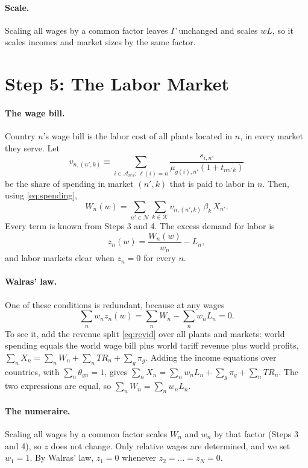 \documentclass[11pt]{article}
\newcommand{\cN}{\mathcal N}
\newcommand{\cK}{\mathcal K}
\newcommand{\cA}{\mathcal A}
\newcommand{\TR}{\mathit{TR}}
\begin{document}
\paragraph{Scale.} Scaling all wages by a common factor leaves $\Gamma$ unchanged and
scales $wL$, so it scales incomes and market sizes by the same factor.

\section{Step 5: The Labor Market}
\label{sec:labor}

\paragraph{The wage bill.} Country $n$'s wage bill is the labor cost of all plants
located in $n$, in every market they serve. Let
\begin{equation}
  v_{n,(n',k)}\equiv\sum_{i\in\cA_{n'k}:\,\ell(i)=n}\frac{s_{i,n'}}{\mu_{g(i),n'}(1+t_{nn'k})}
  \label{eq:vcoef}
\end{equation}
be the share of spending in market $(n',k)$ that is paid to labor in $n$. Then, using
\eqref{eq:spending},
\begin{equation}
  W_n(w)=\sum_{n'\in\cN}\sum_{k\in\cK}v_{n,(n',k)}\,\beta_k\,X_{n'} .
  \label{eq:wagebill}
\end{equation}
Every term is known from Steps 3 and 4. The excess demand for labor is
\begin{equation}
  z_n(w)=\frac{W_n(w)}{w_n}-L_n,
  \label{eq:excess}
\end{equation}
and labor markets clear when $z_n=0$ for every $n$.

\paragraph{Walras' law.} One of these conditions is redundant, because at any wages
\[
  \sum_nw_nz_n(w)=\sum_nW_n-\sum_nw_nL_n=0 .
\]
To see it, add the revenue split \eqref{eq:revid} over all plants and markets: world
spending equals the world wage bill plus world tariff revenue plus world profits,
$\sum_nX_n=\sum_nW_n+\sum_n\TR_n+\sum_g\pi_g$. Adding the income equations over
countries, with $\sum_n\theta_{gn}=1$, gives
$\sum_nX_n=\sum_nw_nL_n+\sum_g\pi_g+\sum_n\TR_n$. The two expressions are equal, so
$\sum_nW_n=\sum_nw_nL_n$.

\paragraph{The numeraire.} Scaling all wages by a common factor scales $W_n$ and $w_n$
by that factor (Steps 3 and 4), so $z$ does not change. Only relative wages are
determined, and we set $w_1=1$. By Walras' law, $z_1=0$ whenever $z_2=\dots=z_N=0$.
\end{document}
